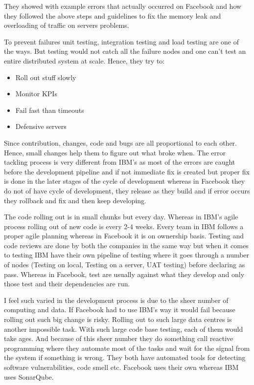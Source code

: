 \documentclass[10pt]{article}
\begin{document}
They showed with example errors that actually occurred on Facebook and how they followed the above steps and guidelines to fix the memory leak and overloading of traffic on servers problems.

To prevent failures unit testing, integration testing and load testing are one of the ways. But testing would not catch all the failure nodes and one can't test an entire distributed system at scale. Hence, they try to:
\begin{itemize}
      \item Roll out stuff slowly
      \item Monitor KPIs
      \item Fail fast than timeouts
      \item Defensive servers
\end{itemize}

Since contribution, changes, code and bugs are all proportional to each other. Hence, small changes help them to figure out what broke when. The error tackling process is very different from IBM's as most of the errors are caught before the development pipeline and if not immediate fix is created but proper fix is done in the later stages of the cycle of development whereas in Facebook they do not of have cycle of development, they release as they build and if error occurs they rollback and fix and then keep developing.

The code rolling out is in small chunks but every day. Whereas in IBM's agile process rolling out of new code is every 2-4 weeks. Every team in IBM follows a proper agile planning whereas in Facebook it is on ownership basis. Testing and code reviews are done by both the companies in the same way but when it comes to testing IBM have their own pipeline of testing where it goes through a number of nodes (Testing on local, Testing on a server, UAT testing) before declaring as pass. Whereas in Facebook, test are usually against what they develop and only those test and their dependencies are run.

I feel such varied in the development process is due to the sheer number of computing and data. If Facebook had to use IBM's way it would fail because rolling out such big change is risky. Rolling out to such large data centres is another impossible task. With such large code base testing, each of them would take ages. And because of this sheer number they do something call reactive programming where they automate most of the tasks and wait for the signal from the system if something is wrong. They both have automated tools for detecting software vulnerabilities, code smell etc. Facebook uses their own whereas IBM uses SonarQube.
\end{document}
